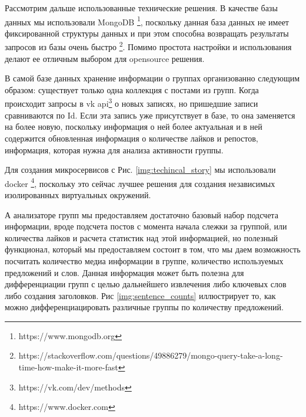 \documentclass[14pt]{matmex-diploma-custom}
\begin{document}
Рассмотрим дальше использованные технические решения. В качестве базы данных мы использовали MongoDB \footnote{https://www.mongodb.org}, поскольку данная база данных не имеет фиксированной структуры данных и при этом способна возвращать результаты запросов из базы очень быстро \footnote{https://stackoverflow.com/questions/49886279/mongo-query-take-a-long-time-how-make-it-more-fast}. Помимо простота настройки и использования делают ее отличным выбором для opensource решения.

В самой базе данных хранение информации о группах организованно следующим образом: существует только одна коллекция с постами из групп. Когда происходит запросы в vk api\footnote{https://vk.com/dev/methods} о новых записях, но пришедшие записи сравниваются по Id. Если эта запись уже присутствует в базе, то она заменяется на более новую, поскольку информация о ней более актуальная и в ней содержится обновленная информация о количестве лайков и репостов, информация, которая нужна для анализа активности группы.

Для создания микросервисов с Рис. \ref{img:techincal_story} мы использовали docker \footnote{https://www.docker.com}, поскольку это сейчас лучшее решения для создания независимых изолированных виртуальных окружений.

А анализаторе групп мы предоставляем достаточно базовый набор подсчета информации, вроде подсчета постов с момента начала слежки за группой, или количества лайков и расчета статистик над этой информацией, но полезный функционал, который мы предоставляем состоит в том, что мы даем возможность посчитать количество медиа информации в группе, количество используемых предложений и слов. Данная информация может быть полезна для дифференциации групп с целью дальнейшего извлечения либо ключевых слов либо создания заголовков. Рис \ref{img:sentence_counts} иллюстрирует то, как можно дифференциацировать различные группы по количеству предложений.
\end{document}
